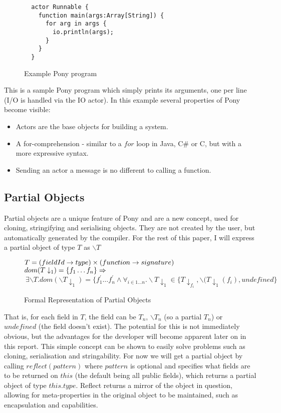 \documentclass{article}
\begin{document}
\begin{figure}[H]
\begin{verbatim}
  actor Runnable {
    function main(args:Array[String]) {
      for arg in args {
      	io.println(args);
      }
    }
  }
\end{verbatim}
\caption{Example Pony program}
\label{fig:simple}
\end{figure}

This is a sample Pony program which simply prints its arguments, one per line (I/O is handled via the IO actor).
In this example several properties of Pony become visible:
\begin{itemize}
\item Actors are the base objects for building a system.
\item A for-comprehension - similar to a $for$ loop in Java, C\# or C, but with
      a more expressive syntax.
\item Sending an actor a message is no different to calling a function.
\end{itemize}

\subsection{Partial Objects}

Partial objects are a unique feature of Pony and are a new concept, used for cloning, stringifying and serialising objects.
They are not created by the user, but automatically generated by the compiler.
For the rest of this paper, I will express a partial object of type $T$ as $\backslash T$

\begin{figure}[H]
$T = (fieldId \to type) \times (function \to signature)\\$
$dom(T\downarrow_{1}) = \{ f_{1} \dots f_{n} \} \Rightarrow\\$
$\> \exists \backslash T.dom(\backslash T\downarrow_{1}) = \{f_{1}^{'}\dots f_{n}^{'}\wedge
\forall_{i\in 1\dots n}.\backslash T\downarrow_{1} \in \{T\downarrow_{f_{i}}, 
\backslash(T\downarrow_{1}(f_{i}), undefined\}$
\caption{Formal Representation of Partial Objects}
\end{figure}

That is, for each field in $T$, the field can be $T_{n}$, $\backslash T_{n}$ (so a partial $T_{n}$) or $undefined$ (the field doesn't exist).
The potential for this is not immediately obvious, but the advantages for the developer will become apparent later on in this report.
This simple concept can be shown to easily solve problems such as cloning, serialisation and stringability.
For now we will get a partial object by calling $reflect(pattern)$ where $pattern$ is optional and specifies what fields are to be returned on $this$ (the default being all public fields), which returns a partial object of type $this.type$.
Reflect returns a mirror\cite{mirror-paper} of the object in question, allowing for meta-properties in the original object to be maintained, such as encapsulation and capabilities.
\end{document}
